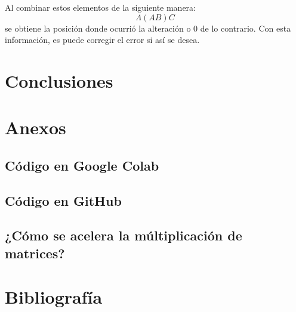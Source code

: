\documentclass{article}
\begin{document}
Al combinar estos elementos de la siguiente manera:
$$
\Lambda(AB)C
$$
se obtiene la posición donde ocurrió la alteración o $0$ de lo contrario. Con esta información, es puede corregir el error si así se desea.

\section{Conclusiones}



\section{Anexos}

\subsection{Código en Google Colab}

\subsection{Código en GitHub}

\subsection{¿Cómo se acelera la múltiplicación de matrices?}



\section{Bibliografía}
\end{document}
